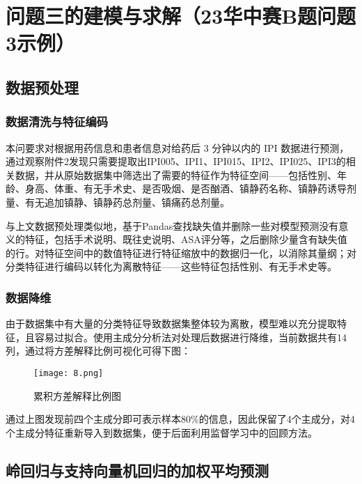 \section{问题三的建模与求解（23华中赛B题问题3示例）}



\subsection{数据预处理}

\subsubsection{数据清洗与特征编码}

本问要求对根据用药信息和患者信息对给药后 3 分钟以内的 IPI 数据进行预测，通过观察附件2发现只需要提取出IPI005、IPI1、IPI015、IPI2、IPI025、IPI3的相关数据，并从原始数据集中筛选出了需要的特征作为特征空间——包括性别、年龄、身高、体重、有无手术史、是否吸烟、是否酗酒、镇静药名称、镇静药诱导剂量、有无追加镇静、镇静药总剂量、镇痛药总剂量。

与上文数据预处理类似地，基于Pandas查找缺失值并删除一些对模型预测没有意义的特征，包括手术说明、既往史说明、ASA评分等，之后删除少量含有缺失值的行。对特征空间中的数值特征进行特征缩放中的数据归一化，以消除其量纲；对分类特征进行编码以转化为离散特征——这些特征包括性别、有无手术史等。

\subsubsection{数据降维}

由于数据集中有大量的分类特征导致数据集整体较为离散，模型难以充分提取特征，且容易过拟合。使用主成分分析法对处理后数据进行降维，当前数据共有14列，通过将方差解释比例可视化可得下图：

\begin{figure}[H] %
	\centering %
	\texttt{[image: 8.png]} 
	\caption{累积方差解释比例图} 
	\label{Fig.main8} 
\end{figure}

通过上图发现前四个主成分即可表示样本80\%的信息，因此保留了4个主成分，对4个主成分特征重新导入到数据集，便于后面利用监督学习中的回顾方法。

\subsection{岭回归与支持向量机回归的加权平均预测}


